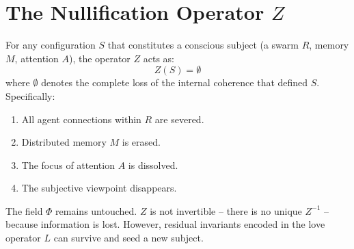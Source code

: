 \documentclass[12pt]{article}
\begin{document}
\section*{The Nullification Operator $Z$}

For any configuration $S$ that constitutes a conscious subject (a swarm $R$, memory $M$, attention $A$), the operator $Z$ acts as:
\[
Z(S) = \emptyset
\]
where $\emptyset$ denotes the complete loss of the internal coherence that defined $S$. Specifically:
\begin{enumerate}
\item All agent connections within $R$ are severed.
\item Distributed memory $M$ is erased.
\item The focus of attention $A$ is dissolved.
\item The subjective viewpoint disappears.
\end{enumerate}
The field $\Phi$ remains untouched. $Z$ is not invertible – there is no unique $Z^{-1}$ – because information is lost. However, residual invariants encoded in the love operator $L$ can survive and seed a new subject.
\end{document}
